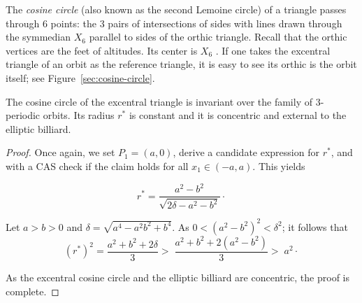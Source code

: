 The {\em cosine circle} (also known as the second Lemoine circle) \cite[Cosine Circle]{mw} of a triangle passes through 6 points: the 3 pairs of intersections of sides with lines drawn through the symmedian $X_6$ parallel to sides of the orthic triangle. Recall that the orthic vertices are the feet of altitudes. Its center is $X_6$ \cite[Cosine Circle]{mw}. If one takes the excentral triangle of an orbit as the reference triangle, it is easy to see its orthic is the orbit itself; see Figure~\ref{sec:cosine-circle}.

\begin{theorem}
The cosine circle of the excentral triangle is invariant over the family of 3-periodic orbits. Its radius $r^*$ is constant and it is concentric and external to the elliptic billiard.
\label{thm:cosine-circle}
\end{theorem}

\begin{proof}
Once again, we set $P_1=(a,0)$, derive a candidate expression for $r^*$, and with a CAS check if the claim holds for all $x_1\in(-a,a)$. This yields

\begin{equation}
r^*=\frac{a^2-b^2}{\sqrt{2\delta-a^2-b^2}}\cdot
\end{equation}

Let $a>b>0$ and $\delta=\sqrt{a^4-a^2 b^2+b^4}$. As $0 < {(a^2-b^2)}^{2}<\delta^2$; it follows that
\begin{equation*} (r^{*})^{2}=  \frac{a^2+ b^2+2\delta}{3}
  > \; \frac{a^2+b^2+2(a^2-b^2)}{3} > \; a^2\cdot
\end{equation*}

As the excentral cosine circle and the elliptic billiard are concentric, the proof is complete.
\end{proof}

